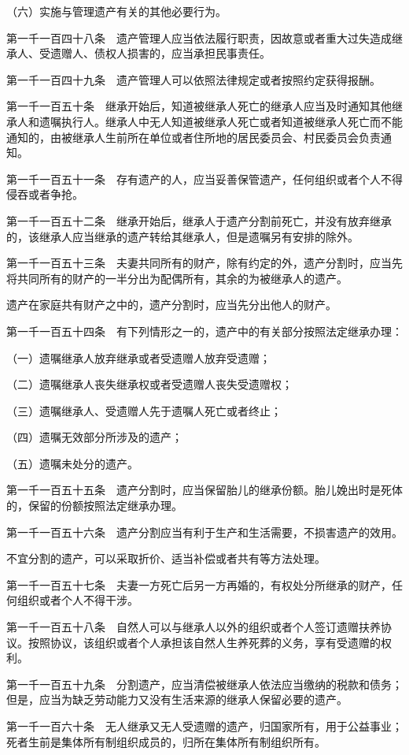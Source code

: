 \documentclass[UTF8,12pt,a4paper]{ctexbook}
\begin{document}
（六）实施与管理遗产有关的其他必要行为。

第一千一百四十八条　遗产管理人应当依法履行职责，因故意或者重大过失造成继承人、受遗赠人、债权人损害的，应当承担民事责任。

第一千一百四十九条　遗产管理人可以依照法律规定或者按照约定获得报酬。

第一千一百五十条　继承开始后，知道被继承人死亡的继承人应当及时通知其他继承人和遗嘱执行人。继承人中无人知道被继承人死亡或者知道被继承人死亡而不能通知的，由被继承人生前所在单位或者住所地的居民委员会、村民委员会负责通知。

第一千一百五十一条　存有遗产的人，应当妥善保管遗产，任何组织或者个人不得侵吞或者争抢。

第一千一百五十二条　继承开始后，继承人于遗产分割前死亡，并没有放弃继承的，该继承人应当继承的遗产转给其继承人，但是遗嘱另有安排的除外。

第一千一百五十三条　夫妻共同所有的财产，除有约定的外，遗产分割时，应当先将共同所有的财产的一半分出为配偶所有，其余的为被继承人的遗产。

遗产在家庭共有财产之中的，遗产分割时，应当先分出他人的财产。

第一千一百五十四条　有下列情形之一的，遗产中的有关部分按照法定继承办理：

（一）遗嘱继承人放弃继承或者受遗赠人放弃受遗赠；

（二）遗嘱继承人丧失继承权或者受遗赠人丧失受遗赠权；

（三）遗嘱继承人、受遗赠人先于遗嘱人死亡或者终止；

（四）遗嘱无效部分所涉及的遗产；

（五）遗嘱未处分的遗产。

第一千一百五十五条　遗产分割时，应当保留胎儿的继承份额。胎儿娩出时是死体的，保留的份额按照法定继承办理。

第一千一百五十六条　遗产分割应当有利于生产和生活需要，不损害遗产的效用。

不宜分割的遗产，可以采取折价、适当补偿或者共有等方法处理。

第一千一百五十七条　夫妻一方死亡后另一方再婚的，有权处分所继承的财产，任何组织或者个人不得干涉。

第一千一百五十八条　自然人可以与继承人以外的组织或者个人签订遗赠扶养协议。按照协议，该组织或者个人承担该自然人生养死葬的义务，享有受遗赠的权利。

第一千一百五十九条　分割遗产，应当清偿被继承人依法应当缴纳的税款和债务；但是，应当为缺乏劳动能力又没有生活来源的继承人保留必要的遗产。

第一千一百六十条　无人继承又无人受遗赠的遗产，归国家所有，用于公益事业；死者生前是集体所有制组织成员的，归所在集体所有制组织所有。
\end{document}
